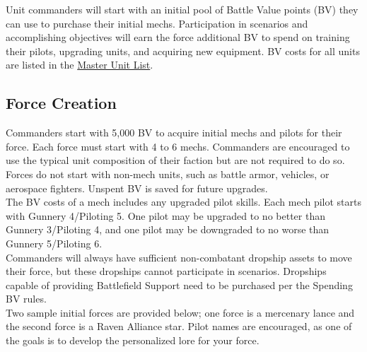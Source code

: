\documentclass[UTF8]{article}
\begin{document}
Unit commanders will start with an initial pool of Battle Value points (BV) they can use to purchase their initial mechs.
Participation in scenarios and accomplishing objectives will earn the force additional BV to spend on training their pilots, upgrading units, and acquiring new equipment.
BV costs for all units are listed in the \href{http://www.masterunitlist.info/}{Master Unit List}.\\

\subsection{Force Creation}

Commanders start with 5,000 BV to acquire initial mechs and pilots for their force.
Each force must start with 4 to 6 mechs.
Commanders are encouraged to use the typical unit composition of their faction but are not required to do so.
Forces do not start with non-mech units, such as battle armor, vehicles, or aerospace fighters.
Unspent BV is saved for future upgrades.\\

The BV costs of a mech includes any upgraded pilot skills.
Each mech pilot starts with Gunnery 4/Piloting 5.
One pilot may be upgraded to no better than Gunnery 3/Piloting 4, and one pilot may be downgraded to no worse than Gunnery 5/Piloting 6.\\

Commanders will always have sufficient non-combatant dropship assets to move their force, but these dropships cannot participate in scenarios.
Dropships capable of providing Battlefield Support need to be purchased per the Spending BV rules.\\

Two sample initial forces are provided below; one force is a mercenary lance and the second force is a Raven Alliance star.
Pilot names are encouraged, as one of the goals is to develop the personalized lore for your force.\\
\end{document}

